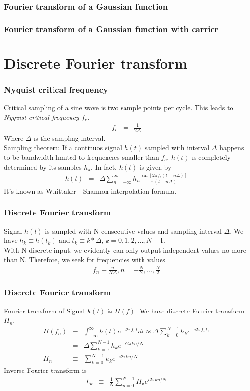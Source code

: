 \documentclass{beamer}
\begin{document}
\begin{frame}
\frametitle{Fourier transform of a Gaussian function}

\end{frame}
\begin{frame}
\frametitle{Fourier transform of a Gaussian function with carrier}

\end{frame}
\section{Discrete Fourier transform}
\begin{frame}
\frametitle{Nyquist critical frequency}
Critical sampling of a sine wave is two sample points per cycle. This leads to \emph{Nyquist critical frequency} $f_c$.
\begin{eqnarray}
f_c &=& \frac{1}{2\Delta}
\label{eq:Nyquist_frequency}
\end{eqnarray}
Where $\Delta$ is the sampling interval. \\
Sampling theorem: If a continuos signal $h(t)$ sampled with interval $\Delta$ happens to be bandwidth limited to frequencies smaller than $f_c$. $h(t)$ is completely determined by its samples $h_n$. In fact, $h(t)$ is given by 
\begin{eqnarray}
h(t) &=& \Delta \sum_{n=-\infty}^{\infty} h_n \frac{\sin [2\pi f_c(t-n\Delta)]}{\pi (t-n\Delta)}
\label{eq:sampling_theorem}
\end{eqnarray}
It's known as Whittaker - Shannon interpolation formula.
\end{frame}
\begin{frame}
\frametitle{Discrete Fourier transform}
Signal $h(t)$ is sampled with N consecutive values and sampling interval $\Delta$. We have $h_k \equiv h(t_k)$ and $t_k \equiv k*\Delta$, $k = 0,1,2,...,N-1$. \\
With N discrete input, we evidently can only output independent values no more than N. Therefore, we seek for frequencies with values
\begin{eqnarray}
f_n \equiv \frac{n}{N\Delta}, n = -\frac{N}{2}, ...,\frac{N}{2}
\label{eq:DFT_Frequencies}
\end{eqnarray}
\end{frame}
\begin{frame}
\frametitle{Discrete Fourier transform}
Fourier transform of Signal $h(t)$ is $H(f)$. We have discrete Fourier transform $H_n$.
\begin{eqnarray}
H(f_n)&=&\int_{-\infty}^{\infty}h(t)e^{-i2\pi f_nt}dt \approx \Delta \sum_{k=0}^{N-1}h_ke^{-i2\pi f_nt_k} \nonumber \\
&=& \Delta \sum_{k=0}^{N-1}h_ke^{-i2\pi kn/N} \nonumber \\
H_n &\equiv& \sum_{k=0}^{N-1}h_ke^{-i2\pi kn/N}
\label{eq:dft}
\end{eqnarray}
Inverse Fourier transform is
\begin{eqnarray}
h_k &\equiv& \frac{1}{N}\sum_{n=0}^{N-1}H_ne^{i2\pi kn/N}
\label{eq:idft}
\end{eqnarray}
\end{frame}
\end{document}
